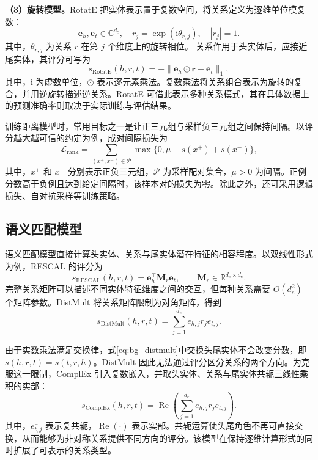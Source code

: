 \textbf{（3）旋转模型。}RotatE 把实体表示置于复数空间，将关系定义为逐维单位模复数\cite{sun2019rotate}：
\begin{equation}
    \mathbf{e}_h,\mathbf{e}_t\in\mathbb{C}^{d_e},
    \quad r_j=\exp(\mathrm{i}\theta_{r,j}),
    \quad |r_j|=1.
\end{equation}
其中，$\theta_{r,j}$ 为关系 $r$ 在第 $j$ 个维度上的旋转相位。
关系作用于头实体后，应接近尾实体，其评分可写为
\begin{equation}
    s_{\mathrm{RotatE}}(h,r,t)
    =-\|\mathbf{e}_h\odot\mathbf{r}-\mathbf{e}_t\|_1,
    \label{eq:bg_rotate}
\end{equation}
其中，$\mathrm{i}$ 为虚数单位，$\odot$ 表示逐元素乘法。复数乘法将关系组合表示为旋转的复合，并用逆旋转描述逆关系。RotatE 可借此表示多种关系模式，其在具体数据上的预测准确率则取决于实际训练与评估结果。

训练距离模型时，常用目标之一是让正三元组与采样负三元组之间保持间隔。以评分越大越可信的约定为例，成对间隔损失为
\begin{equation}
    \mathcal{L}_{\mathrm{rank}}
    =\sum_{(x^+,x^-)\in\mathcal{P}}
      \max\{0,\mu-s(x^+)+s(x^-)\},
    \label{eq:bg_margin}
\end{equation}
其中，$x^+$ 和 $x^-$ 分别表示正负三元组，$\mathcal{P}$ 为采样配对集合，$\mu>0$ 为间隔。正例分数高于负例且达到给定间隔时，该样本对的损失为零。除此之外，还可采用逻辑损失、自对抗采样等训练策略。

\subsection{语义匹配模型}

语义匹配模型直接计算头实体、关系与尾实体潜在特征的相容程度。以双线性形式为例，RESCAL 的评分为\cite{RESCAL_Nickel_2011}
\begin{equation}
    s_{\mathrm{RESCAL}}(h,r,t)
    =\mathbf{e}_h^\top\mathbf{M}_r\mathbf{e}_t,
    \qquad \mathbf{M}_r\in\mathbb{R}^{d_e\times d_e}.
\end{equation}
完整关系矩阵可以描述不同实体特征维度之间的交互，但每种关系需要 $O(d_e^2)$ 个矩阵参数。DistMult 将关系矩阵限制为对角矩阵，得到\cite{yang2015embedding}
\begin{equation}
    s_{\mathrm{DistMult}}(h,r,t)
    =\sum_{j=1}^{d_e} e_{h,j}r_je_{t,j}.
    \label{eq:bg_distmult}
\end{equation}

由于实数乘法满足交换律，式\eqref{eq:bg_distmult}中交换头尾实体不会改变分数，即 $s(h,r,t)=s(t,r,h)$。DistMult 因此无法通过评分区分关系的两个方向。为克服这一限制，ComplEx 引入复数嵌入，并取头实体、关系与尾实体共轭三线性乘积的实部\cite{trouillon2016complex}：
\begin{equation}
    s_{\mathrm{ComplEx}}(h,r,t)
    =\operatorname{Re}\left(\sum_{j=1}^{d_e}
      e_{h,j}r_j\overline{e_{t,j}}\right).
    \label{eq:bg_complex}
\end{equation}
其中，$\overline{e_{t,j}}$ 表示复共轭，$\operatorname{Re}(\cdot)$ 表示实部。共轭运算使头尾角色不再可直接交换，从而能够为非对称关系提供不同方向的评分。该模型在保持逐维计算形式的同时扩展了可表示的关系类型。

